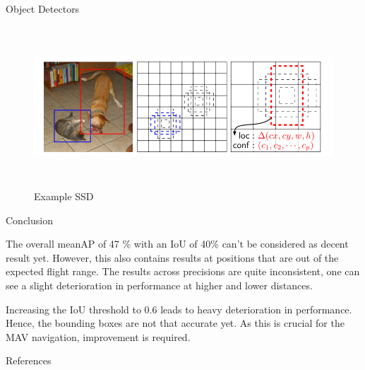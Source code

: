 \documentclass{beamer}
\begin{document}
\begin{frame}[fragile]
\begin{columns}[T]
\begin{column}{.25\textwidth}
\begin{block}{Object Detectors}
		\begin{figure}
			\includegraphics[height=6cm]{fig/ssd}
			\caption{Example SSD \cite{Liu}}
			\label{fig:ssd}
		\end{figure}	
		
	\end{block}


	
	\begin{block}{Conclusion}
		
		The overall meanAP of 47 \% with an IoU of 40\% can't be considered as decent result yet. However, this also contains results at positions that are out of the expected flight range. The results across precisions are quite inconsistent, one can see a slight deterioration in performance at higher and lower distances.
		
		Increasing the IoU threshold to 0.6 leads to heavy deterioration in performance. Hence, the bounding boxes are not that accurate yet. As this is crucial for the MAV navigation, improvement is required.
		

	\end{block}
	\begin{alertblock}{References}
		
		\nocite{*} %
		\small{
			\vspace{0.75in}}
		
	\end{alertblock}
\end{column}


\end{columns}





\end{frame}
\end{document}
